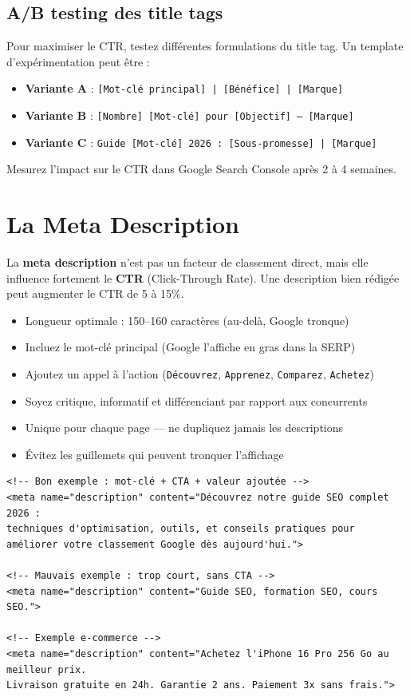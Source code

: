 \documentclass[12pt,a4paper,twoside]{report}
\newcommand{\keyword}[1]{\textbf{\textcolor{googleblue}{#1}}}
\begin{document}
\subsection{A/B testing des title tags}

Pour maximiser le CTR, testez différentes formulations du title tag. Un template d'expérimentation peut être :

\begin{itemize}
    \item \textbf{Variante A} : \texttt{[Mot-clé principal] | [Bénéfice] | [Marque]}
    \item \textbf{Variante B} : \texttt{[Nombre] [Mot-clé] pour [Objectif] — [Marque]}
    \item \textbf{Variante C} : \texttt{Guide [Mot-clé] 2026 : [Sous-promesse] | [Marque]}
\end{itemize}

Mesurez l'impact sur le CTR dans Google Search Console après 2 à 4 semaines.

\section{La Meta Description}

La \keyword{meta description} n'est pas un facteur de classement direct, mais elle influence fortement le \keyword{CTR} (Click-Through Rate). Une description bien rédigée peut augmenter le CTR de 5 à 15\%.

\begin{itemize}
    \item Longueur optimale : 150--160 caractères (au-delà, Google tronque)
    \item Incluez le mot-clé principal (Google l'affiche en gras dans la SERP)
    \item Ajoutez un appel à l'action (\texttt{Découvrez}, \texttt{Apprenez}, \texttt{Comparez}, \texttt{Achetez})
    \item Soyez critique, informatif et différenciant par rapport aux concurrents
    \item Unique pour chaque page --- ne dupliquez jamais les descriptions
    \item Évitez les guillemets qui peuvent tronquer l'affichage
\end{itemize}

\begin{lstlisting}[style=htmlcode,caption={Exemples de Meta Descriptions optimisées}]
<!-- Bon exemple : mot-clé + CTA + valeur ajoutée -->
<meta name="description" content="Découvrez notre guide SEO complet 2026 : 
techniques d'optimisation, outils, et conseils pratiques pour 
améliorer votre classement Google dès aujourd'hui.">

<!-- Mauvais exemple : trop court, sans CTA -->
<meta name="description" content="Guide SEO, formation SEO, cours SEO.">

<!-- Exemple e-commerce -->
<meta name="description" content="Achetez l'iPhone 16 Pro 256 Go au meilleur prix. 
Livraison gratuite en 24h. Garantie 2 ans. Paiement 3x sans frais.">
\end{lstlisting}
\end{document}
